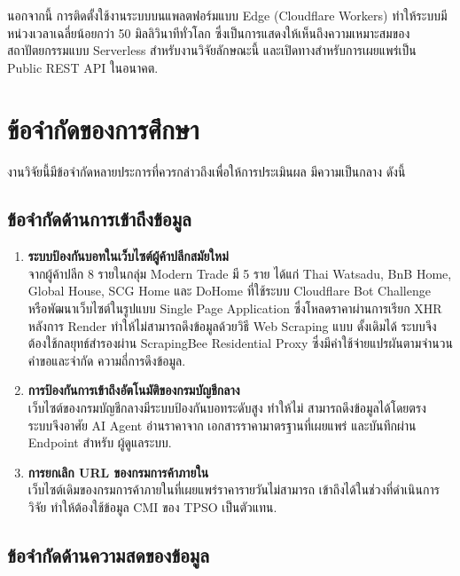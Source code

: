นอกจากนี้ การติดตั้งใช้งานระบบบนแพลตฟอร์มแบบ Edge (Cloudflare
Workers) ทำให้ระบบมีหน่วงเวลาเฉลี่ยน้อยกว่า 50 มิลลิวินาทีทั่วโลก
ซึ่งเป็นการแสดงให้เห็นถึงความเหมาะสมของสถาปัตยกรรมแบบ Serverless
สำหรับงานวิจัยลักษณะนี้ และเปิดทางสำหรับการเผยแพร่เป็น Public REST
API ในอนาคต.

\section{ข้อจำกัดของการศึกษา}
\label{sec:limit}

งานวิจัยนี้มีข้อจำกัดหลายประการที่ควรกล่าวถึงเพื่อให้การประเมินผล
มีความเป็นกลาง ดังนี้

\subsection{ข้อจำกัดด้านการเข้าถึงข้อมูล}

\begin{enumerate}[leftmargin=2em,itemsep=0.2em]
  \item \textbf{ระบบป้องกันบอทในเว็บไซต์ผู้ค้าปลีกสมัยใหม่}\\
        จากผู้ค้าปลีก 8 รายในกลุ่ม Modern Trade มี 5 ราย ได้แก่
        Thai Watsadu, BnB Home, Global House, SCG Home และ DoHome
        ที่ใช้ระบบ Cloudflare Bot Challenge หรือพัฒนาเว็บไซต์ในรูปแบบ
        Single Page Application ซึ่งโหลดราคาผ่านการเรียก XHR หลังการ
        Render ทำให้ไม่สามารถดึงข้อมูลด้วยวิธี Web Scraping แบบ
        ดั้งเดิมได้ ระบบจึงต้องใช้กลยุทธ์สำรองผ่าน ScrapingBee
        Residential Proxy ซึ่งมีค่าใช้จ่ายแปรผันตามจำนวนคำขอและจำกัด
        ความถี่การดึงข้อมูล.

  \item \textbf{การป้องกันการเข้าถึงอัตโนมัติของกรมบัญชีกลาง}\\
        เว็บไซต์ของกรมบัญชีกลางมีระบบป้องกันบอทระดับสูง ทำให้ไม่
        สามารถดึงข้อมูลได้โดยตรง ระบบจึงอาศัย AI Agent อ่านราคาจาก
        เอกสารราคามาตรฐานที่เผยแพร่ และบันทึกผ่าน Endpoint สำหรับ
        ผู้ดูแลระบบ.

  \item \textbf{การยกเลิก URL ของกรมการค้าภายใน}\\
        เว็บไซต์เดิมของกรมการค้าภายในที่เผยแพร่ราคารายวันไม่สามารถ
        เข้าถึงได้ในช่วงที่ดำเนินการวิจัย ทำให้ต้องใช้ข้อมูล CMI
        ของ TPSO เป็นตัวแทน.
\end{enumerate}

\subsection{ข้อจำกัดด้านความสดของข้อมูล}

